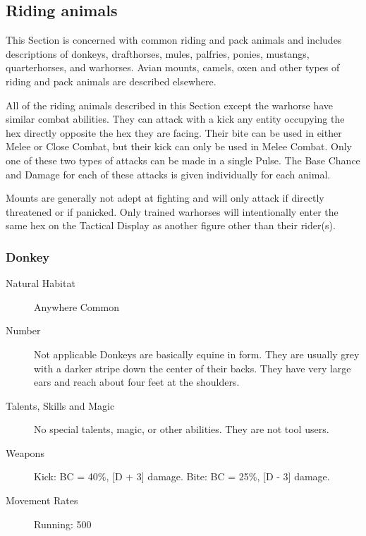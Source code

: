 \begin{multicols}{2}

\setlength\columnseprule{0.2mm}

\section{Riding animals}
This Section is concerned with common riding and pack animals and
includes descriptions of donkeys, drafthorses, mules, palfries,
ponies, mustangs, quarterhorses, and warhorses.  Avian mounts, camels,
oxen and other types of riding and pack animals are described
elsewhere.

All of the riding animals described in this Section except the
warhorse have similar combat abilities.  They can attack with a kick
any entity occupying the hex directly opposite the hex they are
facing.  Their bite can be used in either Melee or Close Combat, but
their kick can only be used in Melee Combat.  Only one of these two
types of attacks can be made in a single Pulse.  The Base Chance and
Damage for each of these attacks is given individually for each
animal.

Mounts are generally not adept at fighting and will only attack if
directly threatened or if panicked.  Only trained warhorses will
intentionally enter the same hex on the Tactical Display as another
figure other than their rider(s).

\subsubsection{Donkey}

\begin{description}
\item[Natural Habitat]  Anywhere Common

\item[Number] Not applicable
 Donkeys are basically equine in form. They are usually
grey with a darker stripe down the center of their backs.  They have
very large ears and reach about four feet at the shoulders.

\item[Talents, Skills and Magic] No special talents, magic, or other abilities. They are not
tool users.

\item[Weapons] Kick: BC = 40\%, [D + 3] damage. Bite: BC = 25\%, [D - 3] damage.

\item[Movement Rates]  Running: 500


\end{description}
\end{multicols}
